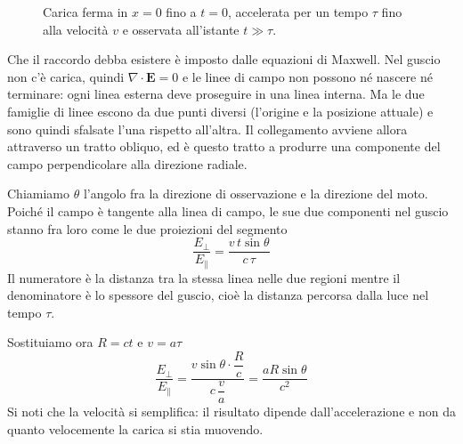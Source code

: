 \begin{figure}[H]
    \caption{Carica ferma in $x=0$ fino a $t=0$, accelerata per un tempo $\tau$ fino alla velocità $v$ e osservata all'istante $t \gg \tau$.}
    \label{fig:raccordo}
\end{figure}

Che il raccordo debba esistere è imposto dalle equazioni di Maxwell. Nel guscio non c'è carica, quindi $\nabla\cdot\mathbf{E} = 0$ e le linee di campo non possono né nascere né terminare: ogni linea esterna deve proseguire in una linea interna. Ma le due famiglie di linee escono da due punti diversi (l'origine e la posizione attuale) e sono quindi sfalsate l'una rispetto all'altra. Il collegamento avviene allora attraverso un tratto obliquo, ed è questo tratto a produrre una componente del campo perpendicolare alla direzione radiale.

Chiamiamo $\theta$ l'angolo fra la direzione di osservazione e la direzione del moto. Poiché il campo è tangente alla linea di campo, le sue due componenti nel guscio stanno fra loro come le due proiezioni del segmento
\begin{equation}
    \frac{E_\perp}{E_\parallel} = \frac{v\,t\sin\theta}{c\,\tau}
    \label{eq:rapporto_componenti}
\end{equation}
Il numeratore è la distanza tra la stessa linea nelle due regioni mentre il denominatore è lo spessore del guscio, cioè la distanza percorsa dalla luce nel tempo $\tau$.

Sostituiamo ora $R = ct$ e $v = a\tau$
\begin{equation}
    \frac{E_\perp}{E_\parallel} = \frac{v\sin\theta \cdot \dfrac{R}{c}}{c\,\dfrac{v}{a}} = \frac{aR\sin\theta}{c^2}
    \label{eq:rapporto_accelerazione}
\end{equation}
Si noti che la velocità si semplifica: il risultato dipende dall'accelerazione e non da quanto velocemente la carica si stia muovendo.


